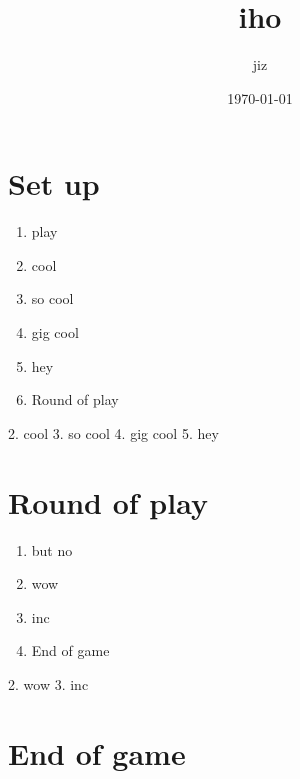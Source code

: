 \documentclass{article}%
\title{iho}%
\author{jiz}%
\date{\today}%
\begin{document}
%
\pagestyle{empty}%
\normalsize%
\maketitle%
\section{ Set up
}%
\label{sec:Setup}%
\begin{enumerate}%
\item%
 play
%
\item%
 cool
%
\item%
 so cool
%
\item%
 gig cool
%
\item%
 hey
%
\item%
Round of play
%
\end{enumerate}%
2. cool
%
3. so cool
%
4. gig cool
%
5. hey


%
\section{ Round of play
}%
\label{sec:Roundofplay}%
\begin{enumerate}%
\item%
 but no
%
\item%
 wow
%
\item%
 inc
%
\item%
End of game%
\end{enumerate}%
2. wow
%
3. inc


%
\section{ End of game}%
\label{sec:Endofgame}%

%
\end{document}
